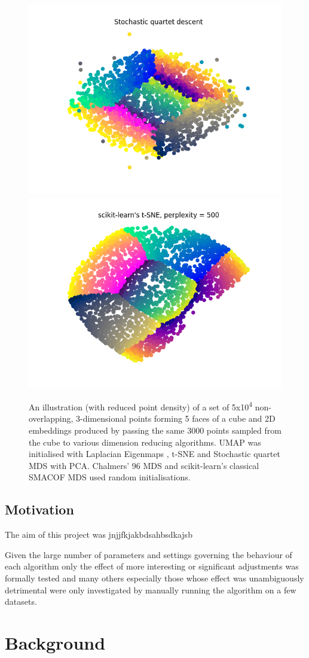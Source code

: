 \documentclass{l4proj}
\begin{document}
\begin{figure}[htb]
    \includegraphics[width=0.3\linewidth]{images/Stochastic quartet descent.png}
    \includegraphics[width=0.3\linewidth]{images/tsne_cube.png}\\

    \caption{An illustration (with reduced point density) of a set of 5x10\textsuperscript{4} non-overlapping, 3-dimensional points forming 5 faces of a cube and 2D embeddings produced by passing the same 3000 points sampled from the cube to various dimension reducing algorithms. UMAP was initialised with Laplacian Eigenmaps \citep{laplacian_eigen}, t-SNE and Stochastic quartet MDS with PCA. Chalmers' 96 MDS and scikit-learn's classical SMACOF MDS used random initialisations.
    }

    \label{fig:init_demo} 
\end{figure}

\section{Motivation}

The aim of this project was jnjjfkjakbdsahbsdkajsb

Given the large number of parameters and settings governing the behaviour of each algorithm only the effect of more interesting or significant adjustments was formally tested and many others especially those whose effect was unambiguously detrimental were only investigated by manually running the algorithm on a few datasets. 
\chapter{Background}
\end{document}
